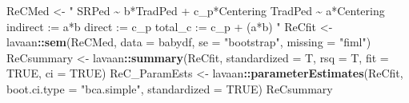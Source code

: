 \documentclass[
  11pt,
]{book}
\newenvironment{Shaded}{\begin{snugshade}}{\end{snugshade}}
\newcommand{\AttributeTok}[1]{\textcolor[rgb]{0.27,0.27,0.27}{#1}}
\newcommand{\ConstantTok}[1]{\textcolor[rgb]{0.37,0.37,0.37}{#1}}
\newcommand{\FunctionTok}[1]{\textcolor[rgb]{0.27,0.27,0.27}{\textbf{#1}}}
\newcommand{\NormalTok}[1]{#1}
\newcommand{\OtherTok}[1]{\textcolor[rgb]{0.37,0.37,0.37}{#1}}
\newcommand{\SpecialCharTok}[1]{\textcolor[rgb]{0.43,0.43,0.43}{\textbf{#1}}}
\newcommand{\StringTok}[1]{\textcolor[rgb]{0.5,0.5,0.5}{#1}}
\begin{document}
\begin{Shaded}
\begin{Highlighting}[]
\NormalTok{ReCMed }\OtherTok{\textless{}{-}} \StringTok{"}
\StringTok{          SRPed \textasciitilde{} b*TradPed + c\_p*Centering}
\StringTok{          TradPed \textasciitilde{} a*Centering}
\StringTok{          }
\StringTok{          indirect :=  a*b}
\StringTok{          direct  := c\_p}
\StringTok{          total\_c  := c\_p + (a*b)}
\StringTok{          "}
\NormalTok{ReCfit }\OtherTok{\textless{}{-}}\NormalTok{ lavaan}\SpecialCharTok{::}\FunctionTok{sem}\NormalTok{(ReCMed, }\AttributeTok{data =}\NormalTok{ babydf, }\AttributeTok{se =} \StringTok{"bootstrap"}\NormalTok{, }\AttributeTok{missing =} \StringTok{"fiml"}\NormalTok{)}
\NormalTok{ReCsummary }\OtherTok{\textless{}{-}}\NormalTok{ lavaan}\SpecialCharTok{::}\FunctionTok{summary}\NormalTok{(ReCfit, }\AttributeTok{standardized =}\NormalTok{ T, }\AttributeTok{rsq =}\NormalTok{ T, }\AttributeTok{fit =} \ConstantTok{TRUE}\NormalTok{,}
    \AttributeTok{ci =} \ConstantTok{TRUE}\NormalTok{)}
\NormalTok{ReC\_ParamEsts }\OtherTok{\textless{}{-}}\NormalTok{ lavaan}\SpecialCharTok{::}\FunctionTok{parameterEstimates}\NormalTok{(ReCfit, }\AttributeTok{boot.ci.type =} \StringTok{"bca.simple"}\NormalTok{,}
    \AttributeTok{standardized =} \ConstantTok{TRUE}\NormalTok{)}
\NormalTok{ReCsummary}
\end{Highlighting}
\end{Shaded}
\end{document}
